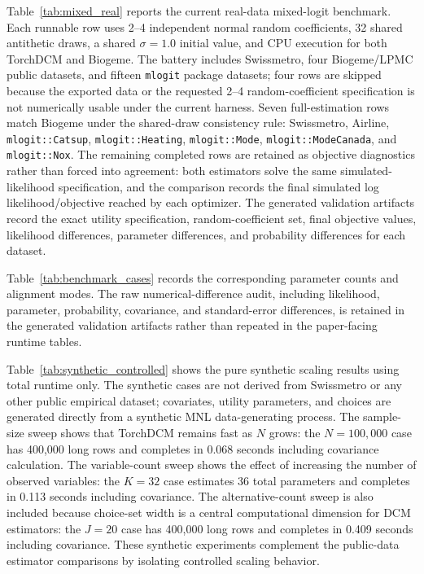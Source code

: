 

Table~\ref{tab:mixed_real} reports the current real-data mixed-logit benchmark.
Each runnable row uses 2--4 independent normal random coefficients, 32 shared antithetic draws, a shared $\sigma=1.0$ initial value, and CPU execution for both TorchDCM and Biogeme.
The battery includes Swissmetro, four Biogeme/LPMC public datasets, and fifteen \texttt{mlogit} package datasets; four rows are skipped because the exported data or the requested 2--4 random-coefficient specification is not numerically usable under the current harness.
Seven full-estimation rows match Biogeme under the shared-draw consistency rule: Swissmetro, Airline, \texttt{mlogit::Catsup}, \texttt{mlogit::Heating}, \texttt{mlogit::Mode}, \texttt{mlogit::ModeCanada}, and \texttt{mlogit::Nox}.
The remaining completed rows are retained as objective diagnostics rather than forced into agreement: both estimators solve the same simulated-likelihood specification, and the comparison records the final simulated log likelihood/objective reached by each optimizer.
The generated validation artifacts record the exact utility specification, random-coefficient set, final objective values, likelihood differences, parameter differences, and probability differences for each dataset.



Table~\ref{tab:benchmark_cases} records the corresponding parameter counts and alignment modes.
The raw numerical-difference audit, including likelihood, parameter, probability, covariance, and standard-error differences, is retained in the generated validation artifacts rather than repeated in the paper-facing runtime tables.



Table~\ref{tab:synthetic_controlled} shows the pure synthetic scaling results using total runtime only.
The synthetic cases are not derived from Swissmetro or any other public empirical dataset; covariates, utility parameters, and choices are generated directly from a synthetic MNL data-generating process.
The sample-size sweep shows that TorchDCM remains fast as $N$ grows: the $N=100{,}000$ case has 400,000 long rows and completes in 0.068 seconds including covariance calculation.
The variable-count sweep shows the effect of increasing the number of observed variables: the $K=32$ case estimates 36 total parameters and completes in 0.113 seconds including covariance.
The alternative-count sweep is also included because choice-set width is a central computational dimension for DCM estimators: the $J=20$ case has 400,000 long rows and completes in 0.409 seconds including covariance.
These synthetic experiments complement the public-data estimator comparisons by isolating controlled scaling behavior.

